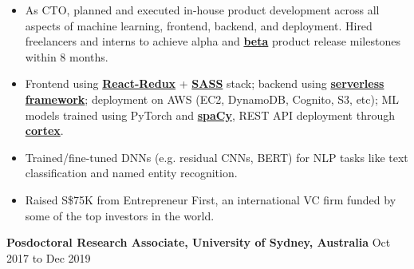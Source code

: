 \documentclass[10pt]{article}
\newenvironment{myinnerlist}[1][\enskip\textbullet]%
        {\begin{itemize}[#1,leftmargin=*,parsep=0pt,itemsep=3pt,topsep=0pt,partopsep=0pt]}
        {\end{itemize}\vspace{.6\baselineskip}}
\newcommand{\localtextbulletone}{\textcolor{gray}{\raisebox{.45ex}{\rule{.8ex}{.8ex}}}}
\begin{document}
{\begin{minipage}[t]{\textwidth+\marginparwidth+\marginparsep}
        \vspace{0.1in}
        \begin{myinnerlist}
            \renewcommand{\labelitemi}{\localtextbulletone}

            \item As CTO, planned and executed in-house product development
                across all aspects of machine learning, frontend, backend, and
                deployment. Hired freelancers and interns to achieve alpha and
                \href{https://raw.githubusercontent.com/sidmontu/sidmontu.github.io/master/misc/beta_screen.png}{\bf
                beta} product release milestones within 8 months.

            \item Frontend using \href{https://react-redux.js.org/}{\bf
                React-Redux} + \href{https://sass-lang.com/}{\bf SASS} stack;
                backend using \href{https://aws.amazon.com/serverless/}{\bf
                serverless framework}; deployment on AWS (EC2, DynamoDB,
                Cognito, S3, etc); ML models trained using PyTorch and
                \href{https://spacy.io/}{\bf spaCy}, REST API deployment through
                \href{https://www.cortex.dev/}{\bf cortex}.

            \item Trained/fine-tuned DNNs (e.g. residual CNNs, BERT) for NLP
                tasks like text classification and named entity recognition.

            \item Raised S\$75K from Entrepreneur First, an international VC
                firm funded by some of the top investors in the world.

        \end{myinnerlist}

        \textbf{Posdoctoral Research Associate, University of Sydney, Australia} \hfill {Oct 2017 to Dec 2019}

        \vspace{0.1in}
        \begin{myinnerlist}
            \renewcommand{\labelitemi}{\localtextbulletone}


\end{myinnerlist}
\end{minipage}}
\end{document}
